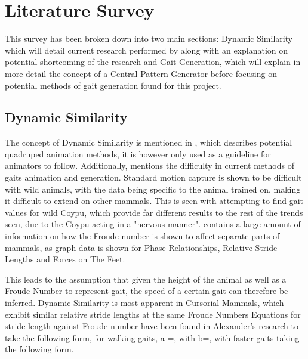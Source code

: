 \chapter{Literature Survey}
This survey has been broken down into two main sections: Dynamic Similarity which will detail current research performed by \cite{Alexander1983} along with an explanation on potential shortcoming of the research and Gait Generation, which will explain in more detail the concept of a Central Pattern Generator before focusing on potential methods of gait generation found for this project.
\section{Dynamic Similarity}


The concept of Dynamic Similarity is mentioned in \cite{Skrba2010}, which describes potential quadruped animation methods, it is however only used as a guideline for animators to follow. Additionally, \cite{Skrba2010} mentions the difficulty in current methods of  gaits animation and generation. Standard motion capture is shown to be difficult with wild animals, with the data being specific to the animal trained on, making it difficult to extend on other mammals. This is seen with \cite{Alexander1983} attempting to find gait values for wild Coypu, which provide far different results to the rest of the trends seen, due to the Coypu acting in a "nervous manner". 
\cite{Alexander1983}contains a large amount of information on how the Froude number is shown to affect separate parts of mammals, as graph data is shown for Phase Relationships, Relative Stride Lengths and Forces on The Feet. 

This leads to the assumption that given the height of the animal as well as a Froude Number to represent gait, the speed of a certain gait can therefore be inferred. Dynamic Similarity is most apparent in Cursorial Mammals, which  exhibit similar relative stride lengths at the same Froude Numbers Equations for stride length against Froude number have been found in Alexander's research to take the following form, for walking gaits, a =, with b=, with faster gaits taking the following form. 



